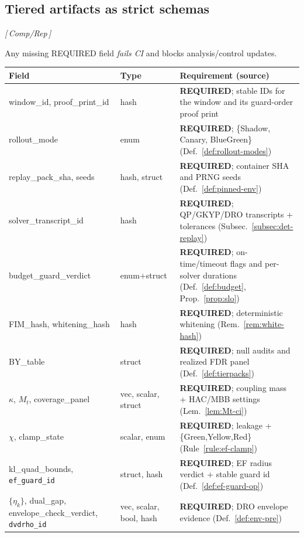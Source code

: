 \documentclass[10pt]{article}
\newcommand{\layertag}[1]{\textsf{\footnotesize[\,#1\,]}}
\begin{document}
\subsection{Tiered artifacts as strict schemas}\label{subsec:schemas}
\emph{\layertag{Comp/Rep}}

Any missing REQUIRED field \emph{fails CI} and blocks analysis/control updates.

\begin{table}[t]
\centering
\renewcommand{\arraystretch}{1.08}
\begin{tabularx}{\textwidth}{@{}>{\raggedright\arraybackslash}p{3.7cm} >{\raggedright\arraybackslash}p{2.9cm} >{\raggedright\arraybackslash}X@{}}
\toprule
\textbf{Field} & \textbf{Type} & \textbf{Requirement (source)} \\
\midrule
window\_id, proof\_print\_id & hash & \textbf{REQUIRED}; stable IDs for the window and its guard-order proof print \\
rollout\_mode & enum & \textbf{REQUIRED}; \{Shadow, Canary, BlueGreen\} (Def.~\ref{def:rollout-modes}) \\
replay\_pack\_sha, seeds & hash, struct & \textbf{REQUIRED}; container SHA and PRNG seeds (Def.~\ref{def:pinned-env}) \\
solver\_transcript\_id & hash & \textbf{REQUIRED}; QP/GKYP/DRO transcripts + tolerances (Subsec.~\ref{subsec:det-replay}) \\
budget\_guard\_verdict & enum+struct & \textbf{REQUIRED}; on-time/timeout flags and per-solver durations (Def.~\ref{def:budget}, Prop.~\ref{prop:slo}) \\
FIM\_hash, whitening\_hash & hash & \textbf{REQUIRED}; deterministic whitening (Rem.~\ref{rem:white-hash}) \\
BY\_table & struct & \textbf{REQUIRED}; null audits and realized FDR panel (Def.~\ref{def:tierpacks}) \\
$\kappa$, $M_t$, coverage\_panel & vec, scalar, struct & \textbf{REQUIRED}; coupling mass + HAC/MBB settings (Lem.~\ref{lem:Mt-ci}) \\
$\chi$, clamp\_state & scalar, enum & \textbf{REQUIRED}; leakage + \{Green,Yellow,Red\} (Rule~\ref{rule:ef-clamp}) \\
kl\_quad\_bounds, \texttt{ef\_guard\_id} & struct, hash & \textbf{REQUIRED}; EF radius verdict + stable guard id (Def.~\ref{def:ef-guard-op}) \\
$\{\eta_k\}$, dual\_gap, envelope\_check\_verdict, \texttt{dvdrho\_id} & vec, scalar, bool, hash & \textbf{REQUIRED}; DRO envelope evidence (Def.~\ref{def:env-pre}) \\

\end{tabularx}
\end{table}
\end{document}
